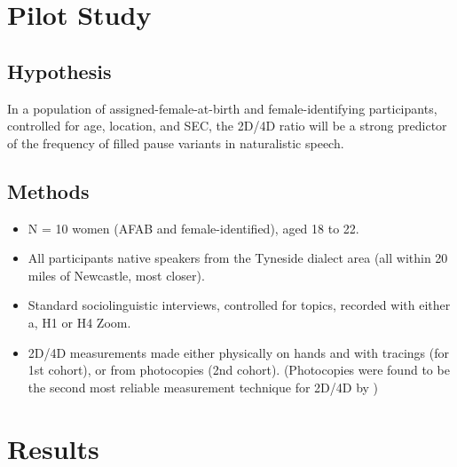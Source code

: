 \documentclass[a0,portrait]{a0poster}
\begin{document}
\begin{multicols}{2}

\section*{Pilot Study}

\subsection{Hypothesis}

In a population of assigned-female-at-birth and female-identifying participants, controlled for age, location, and SEC, the 2D/4D ratio will be a strong predictor of the frequency of filled pause variants in naturalistic speech.

\subsection{Methods}
\begin{itemize}
	\item N = 10 women (AFAB and female-identified), aged 18 to 22.
	\item All participants native speakers from the Tyneside dialect area (all within 20 miles of Newcastle, most closer).
	\item Standard sociolinguistic interviews, controlled for topics, recorded with either a, H1 or H4 Zoom.
	\item 2D/4D measurements made either physically on hands and with tracings (for 1st cohort), or from photocopies (2nd cohort). (Photocopies were found to be the second most reliable measurement technique for 2D/4D by \citealt{allawayetal2009})
\end{itemize}



\section*{Results}




\end{multicols}
\end{document}

